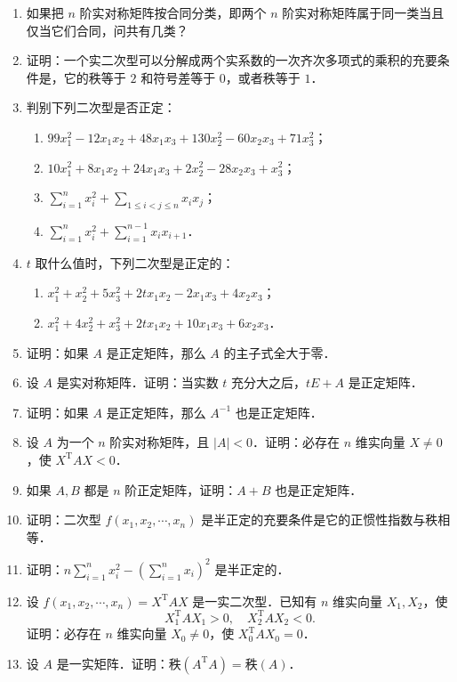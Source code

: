 \begin{enumerate}
\begin{enumerate}
    \item $A$ 是反称矩阵当且仅当对任意一个 $n$ 维向量 $X$，有 $X^{\mathrm{T}}AX=0$；
  \anssub
    \item 如果 $A$ 是对称矩阵，且对任意一个 $n$ 维向量 $X$ 有 $X^{\mathrm{T}}AX=0$，那么 $A=O$．
  \anssub
  \end{enumerate}
  \item 如果把 $n$ 阶实对称矩阵按合同分类，即两个 $n$ 阶实对称矩阵属于同一类当且仅当它们合同，问共有几类？
  \ansgeneral
  \item 证明：一个实二次型可以分解成两个实系数的一次齐次多项式的乘积的充要条件是，它的秩等于 $2$ 和符号差等于 $0$，或者秩等于 $1$．
  \ansproof
  \item 判别下列二次型是否正定：
  \begin{enumerate}
    \item $99x_1^2-12x_1x_2+48x_1x_3+130x_2^2-60x_2x_3+71x_3^2$；
  \anssub
    \item $10x_1^2+8x_1x_2+24x_1x_3+2x_2^2-28x_2x_3+x_3^2$；
  \anssub
    \item $\sum\limits_{i=1}^{n}x_i^2+\sum\limits_{1\leqslant i<j\leqslant n}x_ix_j$；
  \anssub
    \item $\sum\limits_{i=1}^{n}x_i^2+\sum\limits_{i=1}^{n-1}x_ix_{i+1}$．
  \anssub
  \end{enumerate}
  \item $t$ 取什么值时，下列二次型是正定的：
  \begin{enumerate}
    \item $x_1^2+x_2^2+5x_3^2+2tx_1x_2-2x_1x_3+4x_2x_3$；
  \anssub
    \item $x_1^2+4x_2^2+x_3^2+2tx_1x_2+10x_1x_3+6x_2x_3$．
  \anssub
  \end{enumerate}
  \item 证明：如果 $A$ 是正定矩阵，那么 $A$ 的主子式全大于零．
  \ansproof
  \item 设 $A$ 是实对称矩阵．证明：当实数 $t$ 充分大之后，$tE+A$ 是正定矩阵．
  \ansproof
  \item 证明：如果 $A$ 是正定矩阵，那么 $A^{-1}$ 也是正定矩阵．
  \ansproof
  \item 设 $A$ 为一个 $n$ 阶实对称矩阵，且 $|A|<0$．证明：必存在 $n$ 维实向量 $X\neq0$，使 $X^{\mathrm{T}}AX<0$．
  \ansproof
  \item 如果 $A,B$ 都是 $n$ 阶正定矩阵，证明：$A+B$ 也是正定矩阵．
  \ansproof
  \item 证明：二次型 $f(x_1,x_2,\cdots,x_n)$ 是半正定的充要条件是它的正惯性指数与秩相等．
  \ansproof
  \item 证明：$n\sum\limits_{i=1}^{n}x_i^2-\left(\sum\limits_{i=1}^{n}x_i\right)^2$ 是半正定的．
  \ansproof
  \item 设 $f(x_1,x_2,\cdots,x_n)=X^{\mathrm{T}}AX$ 是一实二次型．已知有 $n$ 维实向量 $X_1,X_2$，使
  \[
    X_1^{\mathrm{T}}AX_1>0,\quad X_2^{\mathrm{T}}AX_2<0.
  \]
  证明：必存在 $n$ 维实向量 $X_0\neq0$，使 $X_0^{\mathrm{T}}AX_0=0$．
  \ansproof
  \item 设 $A$ 是一实矩阵．证明：秩$(A^{\mathrm{T}}A)=$秩$(A)$．
  \ansproof
\end{enumerate}

